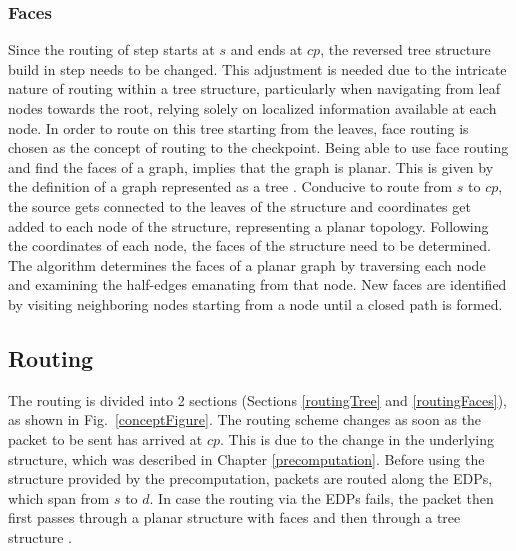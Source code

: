 \documentclass[conference]{IEEEtran}
\begin{document}
\subsubsection{Faces}
\label{precompFace}
Since the routing of step  starts at $s$ and ends at $cp$, the reversed tree structure build in step  needs to be changed. 
This adjustment is needed due to the intricate nature of routing within a tree structure, particularly when navigating from leaf nodes towards the root, relying solely on localized information available at each node.
In order to route on this tree starting from the leaves, face routing is chosen as the concept of routing to the checkpoint. 
Being able to use face routing and find the faces of a graph, implies that the graph is planar. 
This is given by the definition of a graph represented as a tree \cite{treeIsPlanar}.
Conducive to route from $s$ to $cp$, the source gets connected to the leaves of the structure and coordinates get added to each node of the structure, representing a planar topology.
Following the coordinates of each node, the faces of the structure need to be determined.
The algorithm determines the faces of a planar graph by traversing each node and examining the half-edges emanating from that node. 
New faces are identified by visiting neighboring nodes starting from a node until a closed path is formed.

\subsection{Routing}
The routing is divided into 2 sections (Sections \ref{routingTree} and \ref{routingFaces}), as shown in Fig.~\ref{conceptFigure}. The routing scheme changes as soon as the packet to be sent has arrived at $cp$. This is due to the change in the underlying structure, which was described in Chapter \ref{precomputation}.
Before using the structure provided by the precomputation, packets are routed along the EDPs, which span from $s$ to $d$.
In case the routing via the EDPs fails, the packet then first passes through a planar structure with faces  and then through a tree structure .
\end{document}
